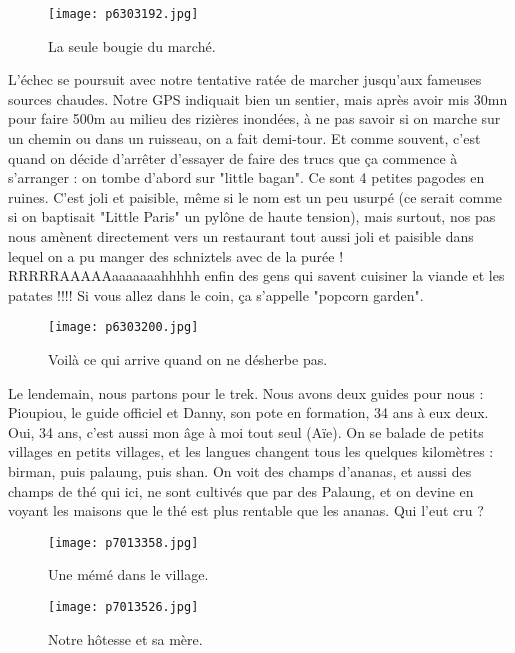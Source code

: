 \documentclass{book}
\begin{document}
\begin{figure}[h]
\centering
\texttt{[image: p6303192.jpg]}
\caption*{La seule bougie du marché.}
\end{figure}

L'échec se poursuit avec notre tentative ratée de marcher jusqu'aux fameuses sources chaudes. Notre GPS indiquait bien un sentier, mais après avoir mis 30mn pour faire 500m au milieu des rizières inondées, à ne pas savoir si on marche sur un chemin ou dans un ruisseau, on a fait demi-tour. Et comme souvent, c'est quand on décide d'arrêter d'essayer de faire des trucs que ça commence à s'arranger : on tombe d'abord sur "little bagan". Ce sont 4 petites pagodes en ruines. C'est joli et paisible, même si le nom est un peu usurpé (ce serait comme si on baptisait "Little Paris" un pylône de haute tension), mais surtout, nos pas nous amènent directement vers un restaurant tout aussi joli et paisible dans lequel on a pu manger des schniztels avec de la purée ! RRRRRAAAAAaaaaaaahhhhh enfin des gens qui savent cuisiner la viande et les patates !!!! Si vous allez dans le coin, ça s'appelle "popcorn garden".


\begin{figure}[h]
\centering
\texttt{[image: p6303200.jpg]}
\caption*{Voilà ce qui arrive quand on ne désherbe pas.}
\end{figure}

Le lendemain, nous partons pour le trek. Nous avons deux guides pour nous : Pioupiou, le guide officiel et Danny, son pote en formation, 34 ans à eux deux. Oui, 34 ans, c'est aussi mon âge à moi tout seul (Aïe). On se balade de petits villages en petits villages, et les langues changent tous les quelques kilomètres : birman, puis palaung, puis shan. On voit des champs d'ananas, et aussi des champs de thé qui ici, ne sont cultivés que par des Palaung, et on devine en voyant les maisons que le thé est plus rentable que les ananas. Qui l'eut cru ?


\begin{figure}[h]
\centering
\texttt{[image: p7013358.jpg]}
\caption*{Une mémé dans le village.}
\end{figure}


\begin{figure}[h]
\centering
\texttt{[image: p7013526.jpg]}
\caption*{Notre hôtesse et sa mère.}
\end{figure}
\end{document}
